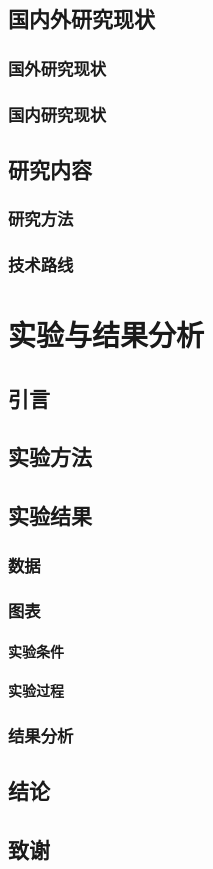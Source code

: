 \documentclass{ctexbook}
\begin{document}
	\section{国内外研究现状}
	\subsection{国外研究现状}
	\subsection{国内研究现状}
	\section{研究内容}
	\subsection{研究方法}
	\subsection{技术路线}
	
	\chapter{实验与结果分析}
	\section{引言}
	\section{实验方法}
	\section{实验结果}
	\subsection{数据}
	\subsection{图表}
	\subsubsection{实验条件}
	\subsubsection{实验过程}
	\subsection{结果分析}
	\section{结论}
	\section{致谢}

	
		
\end{document}
